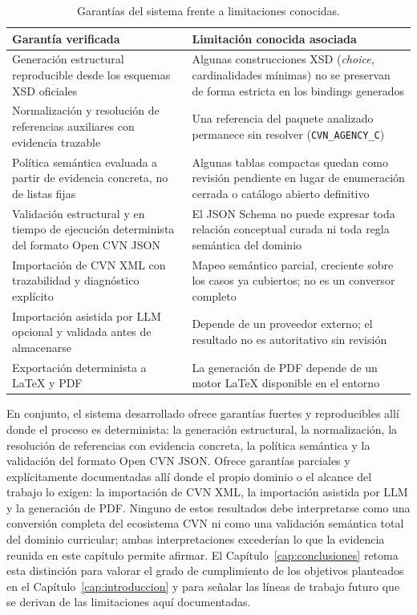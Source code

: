 \begin{table}[htbp]
  \centering
  \footnotesize
  \renewcommand{\arraystretch}{1.5}
  \caption{Garantías del sistema frente a limitaciones conocidas.}
  \label{tab:evaluacion_garantias}
  \begin{tabular}{p{} p{}}
    \hline
    \textbf{Garantía verificada} & \textbf{Limitación conocida asociada} \\
    \hline
    Generación estructural reproducible desde los esquemas XSD oficiales & Algunas construcciones XSD (\textit{choice}, cardinalidades mínimas) no se preservan de forma estricta en los bindings generados \\
    Normalización y resolución de referencias auxiliares con evidencia trazable & Una referencia del paquete analizado permanece sin resolver (\texttt{CVN\_AGENCY\_C}) \\
    Política semántica evaluada a partir de evidencia concreta, no de listas fijas & Algunas tablas compactas quedan como revisión pendiente en lugar de enumeración cerrada o catálogo abierto definitivo \\
    Validación estructural y en tiempo de ejecución determinista del formato Open CVN JSON & El JSON Schema no puede expresar toda relación conceptual curada ni toda regla semántica del dominio \\
    Importación de CVN XML con trazabilidad y diagnóstico explícito & Mapeo semántico parcial, creciente sobre los casos ya cubiertos; no es un conversor completo \\
    Importación asistida por LLM opcional y validada antes de almacenarse & Depende de un proveedor externo; el resultado no es autoritativo sin revisión \\
    Exportación determinista a LaTeX y PDF & La generación de PDF depende de un motor LaTeX disponible en el entorno \\
    \hline
  \end{tabular}
\end{table}

En conjunto, el sistema desarrollado ofrece garantías fuertes y
reproducibles allí donde el proceso es determinista: la generación
estructural, la normalización, la resolución de referencias con evidencia
concreta, la política semántica y la validación del formato Open CVN JSON.
Ofrece garantías parciales y explícitamente documentadas allí donde el
propio dominio o el alcance del trabajo lo exigen: la importación de CVN
XML, la importación asistida por LLM y la generación de PDF. Ninguno de
estos resultados debe interpretarse como una conversión completa del
ecosistema CVN ni como una validación semántica total del dominio
curricular; ambas interpretaciones excederían lo que la evidencia reunida en
este capítulo permite afirmar. El Capítulo~\ref{cap:conclusiones} retoma esta distinción para
valorar el grado de cumplimiento de los objetivos planteados en el
Capítulo~\ref{cap:introduccion} y para señalar las líneas de trabajo futuro
que se derivan de las limitaciones aquí documentadas.
